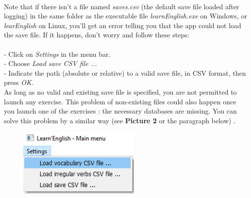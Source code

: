 \documentclass[12pt, a4paper]{report}
\begin{document}
\paragraph{}Note that if there isn't a file named \textit{saves.csv} (the default save file loaded after logging)  in the same folder as the executable file \textit{learnEnglish.exe} on Windows, or \textit{learEnglish} on Linux, you'll get an error telling you that the app could not load the save file. If it happens, don't worry and follow these steps:\\
\\
\hspace*{0.5cm}- Click on \textit{Settings} in the menu bar.\\
\hspace*{0.5cm}- Choose \textit{Load save CSV file ...}\\
\hspace*{0.5cm}- Indicate the path (absolute or relative) to a valid save file, in CSV format, then press \textit{OK}.\\

As long as no valid and existing save file is specified, you are not permitted to launch any exercise. This problem of non-existing files could also happen once you launch one of the exercises : the necessary databases are missing. You can solve this problem by a similar way (see \textbf{Picture 2} or the paragraph below) .

\begin{figure}[H]
    \centering
    \includegraphics[scale=0.70]{images/menu.png}
\end{figure}
\end{document}
